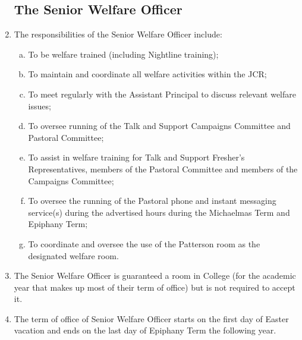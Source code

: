 \documentclass[12pt]{article}
\begin{document}
\begin{enumerate}
    \subsection{The Senior Welfare Officer}
    \item The responsibilities of the Senior Welfare Officer include:
    \begin{enumerate}[(a)]
        \item To be welfare trained (including Nightline training);
        \item To maintain and coordinate all welfare activities within the JCR;
        \item To meet regularly with the Assistant Principal to discuss relevant welfare issues;
        \item To oversee running of the Talk and Support Campaigns Committee and Pastoral Committee;
        \item To assist in welfare training for Talk and Support Fresher's Representatives, members of the Pastoral Committee and members of the Campaigns Committee;
        \item To oversee the running of the Pastoral phone and instant messaging service(s) during the advertised hours during the Michaelmas Term and Epiphany Term;
        \item To coordinate and oversee the use of the Patterson room as the designated welfare room.
    \end{enumerate}
    \item The Senior Welfare Officer is guaranteed a room in College (for the academic year that makes up most of their term of office) but is not required to accept it.
    \item The term of office of Senior Welfare Officer starts on the first day of Easter vacation and ends on the last day of Epiphany Term the following year.

\end{enumerate}
\end{document}
